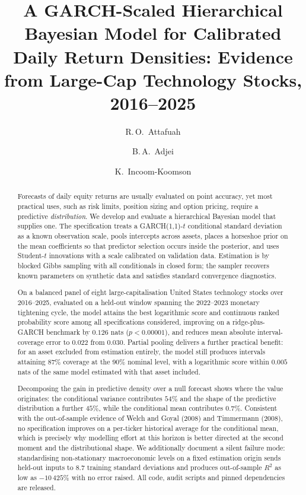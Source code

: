 \documentclass[11pt]{article}
\title{\bfseries A GARCH-Scaled Hierarchical Bayesian Model for Calibrated
Daily Return Densities: Evidence from Large-Cap Technology Stocks, 2016--2025}
\author[1]{R.\,O.\ Attafuah}
\author[2]{B.\,A.\ Adjei}
\author[3]{K.\ Incoom-Koomson}
\affil[1]{Miami University}
\affil[2]{Texas State University}
\affil[3]{Georgia State University}
\date{}
\begin{document}
\maketitle

\begin{abstract}
\noindent
Forecasts of daily equity returns are usually evaluated on point accuracy, yet
most practical uses, such as risk limits, position sizing and option pricing, require a
predictive \emph{distribution}. We develop and evaluate a hierarchical Bayesian
model that supplies one. The specification treats a GARCH(1,1)-$t$ conditional
standard deviation as a known observation scale, pools intercepts across assets,
places a horseshoe prior on the mean coefficients so that predictor selection
occurs inside the posterior, and uses Student-$t$ innovations with a scale
calibrated on validation data. Estimation is by blocked Gibbs sampling with all
conditionals in closed form; the sampler recovers known parameters on synthetic
data and satisfies standard convergence diagnostics.

On a balanced panel of eight large-capitalisation United States technology
stocks over 2016--2025, evaluated on a held-out window spanning the 2022--2023
monetary tightening cycle, the model attains the best logarithmic score and
continuous ranked probability score among all specifications considered,
improving on a ridge-plus-GARCH benchmark by $0.126$ nats
($p<0.00001$), and reduces mean absolute interval-coverage error to $0.022$ from
$0.030$. Partial pooling delivers a further practical benefit: for an asset
excluded from estimation entirely, the model still produces intervals attaining
$87\%$ coverage at the $90\%$ nominal level, with a logarithmic score within
$0.005$ nats of the same model estimated with that asset included.

Decomposing the gain in predictive density over a null forecast shows where the
value originates: the conditional variance contributes $54\%$ and the shape of
the predictive distribution a further $45\%$, while the conditional mean
contributes $0.7\%$. Consistent with the out-of-sample evidence of Welch and
Goyal (2008) and Timmermann (2008), no specification improves on a per-ticker
historical average for the conditional mean, which is precisely why modelling
effort at this horizon is better directed at the second moment and the
distributional shape. We additionally document a silent failure mode:
standardising non-stationary macroeconomic levels on a fixed estimation origin
sends held-out inputs to $8.7$ training standard deviations and produces
out-of-sample $R^2$ as low as $-10\,425\%$ with no error raised. All code, audit
scripts and pinned dependencies are released.
\end{abstract}
\end{document}
